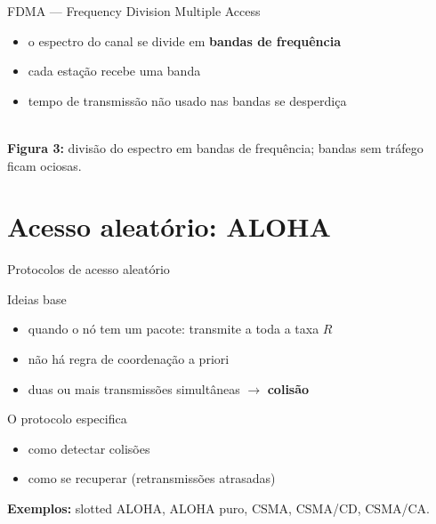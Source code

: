 \documentclass[aspectratio=169,11pt]{beamer}
\begin{document}
\begin{frame}{FDMA --- Frequency Division Multiple Access}
  \begin{itemize}
    \item o espectro do canal se divide em \textbf{bandas de frequência}
    \item cada estação recebe uma banda
    \item \alert{tempo de transmissão não usado nas bandas se desperdiça}
  \end{itemize}
  \begin{center}
    \\[1mm]
    {\scriptsize \textbf{Figura 3:} divisão do espectro em bandas de frequência; bandas sem tráfego ficam ociosas.}
  \end{center}
\end{frame}

\section{Acesso aleatório: ALOHA}

\begin{frame}{Protocolos de acesso aleatório}
  \begin{block}{Ideias base}
    \begin{itemize}
      \item quando o nó tem um pacote: transmite a toda a taxa $R$
      \item não há regra de coordenação a priori
      \item duas ou mais transmissões simultâneas $\rightarrow$ \textbf{colisão}
    \end{itemize}
  \end{block}
  \begin{block}{O protocolo especifica}
    \begin{itemize}
      \item como detectar colisões
      \item como se recuperar (retransmissões atrasadas)
    \end{itemize}
  \end{block}
  \textbf{Exemplos:} slotted ALOHA, ALOHA puro, CSMA, CSMA/CD, CSMA/CA.
\end{frame}
\end{document}
